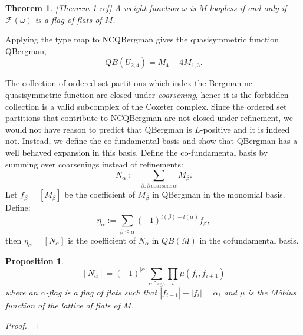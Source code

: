 \documentclass[12pt,reqno]{amsart}
\numberwithin{definition}{section}
\newtheorem{proposition}[definition]{Proposition}
\newtheorem{theorem}[definition]{Theorem}
\theoremstyle{definition}
\newcommand{\om}{\omega}
\begin{document}
\begin{theorem}\label{thm:Bergman}[Theorem 1 ref]
A weight function $\omega$ is $M$-loopless if and only if $\mathcal{F}(\om)$ is a flag of flats of $M$.
\end{theorem}


Applying the type map to NCQBergman gives the quasisymmetric
function QBergman, 
$$QB(U_{2,4}) = M_4 + 4M_{1,3}.$$


The collection of ordered set partitions which index the Bergman
nc-quasisymmetric function are closed under {\em coarsening}, hence it
is the forbidden collection is a valid subcomplex of the Coxeter
complex.  Since the ordered set partitions that contribute to
NCQBergman are not closed under refinement, we would not have reason
to predict that QBergman is $L$-positive and it is indeed not.
 Instead, we define the co-fundamental basis and show that QBergman
 has a well behaved expansion in this basis.
Define the co-fundamental basis by summing over coarsenings instead of refinements:
$$ N_{\alpha} := \sum_{\beta : \beta \, \textrm{coarsens} \, \alpha} M_{\beta}.$$
Let $f_{\beta} = [M_{\beta}]$ be the coefficient of $M_{\beta}$ in
QBergman in the monomial basis.  Define: 
$$\eta_{\alpha} := \sum_{\beta \leq \alpha} (-1)^{l(\beta)-l(\alpha)}f_{\beta},$$
then $\eta_{\alpha} = [N_{\alpha}]$ is the coefficient of $N_{\alpha}$ in $QB(M)$ in the cofundamental basis.


\begin{proposition}
$$[N_{\alpha}] = (-1)^{|\alpha|} \sum_{\alpha \, \textrm{flags}} \prod_i \mu(f_i,f_{i+1})$$
where an $\alpha$-flag is a flag of flats such that $|f_{i+1}| - |f_i| = \alpha_i$ and $\mu$ is the M\"{o}bius function of the lattice of flats of $M$.
\end{proposition}

\begin{proof}
\end{proof}
\end{document}
